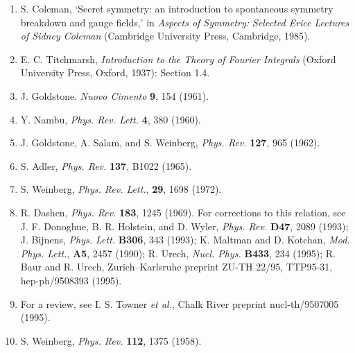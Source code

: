 
\begin{enumerate}
\item {}\label{ch19-ref-1}
S. Coleman, `Secret symmetry: an introduction to spontaneous symmetry breakdown and gauge fields,' in \emph{Aspects of Symmetry: Selected Erice Lectures of Sidney Coleman} (Cambridge University Press, Cambridge, 1985).

\item {}\label{ch19-ref-2}
E. C. Titchmarsh, \emph{Introduction to the Theory of Fourier Integrals} (Oxford University Press, Oxford, 1937): Section 1.4.

\item {}\label{ch19-ref-3}
J. Goldstone. \emph{Nuovo Cimento} \textbf{9}, 154 (1961).

\item {}\label{ch19-ref-4}
Y. Nambu, \emph{Phys. Rev. Lett.} \textbf{4}, 380 (1960).

\item {}\label{ch19-ref-5}
J. Goldstone, A. Salam, and S. Weinberg, \emph{Phys. Rev.} \textbf{127}, 965 (1962).

\item {}\label{ch19-ref-6}
S. Adler, \emph{Phys. Rev.} \textbf{137}, B1022 (1965).

\item {}\label{ch19-ref-7}
S. Weinberg, \emph{Phys. Rev. Lett.}, \textbf{29}, 1698 (1972).

\item {}\label{ch19-ref-8}
R. Dashen, \emph{Phys. Rev.} \textbf{183}, 1245 (1969). For corrections to this relation, see J. F. Donoghue, B. R. Holstein, and D. Wyler, \emph{Phys. Rev.} \textbf{D47}, 2089 (1993); J. Bijnens, \emph{Phys. Lett.} \textbf{B306}, 343 (1993); K. Maltman and D. Kotchan, \emph{Mod. Phys. Lett.}, \textbf{A5}, 2457 (1990); R. Urech, \emph{Nucl. Phys.} \textbf{B433}, 234 (1995); R. Baur and R. Urech, Zurich--Karlsruhe preprint ZU-TH 22/95, TTP95-31, hep-ph/9508393 (1995).

\item {}\label{ch19-ref-9}
For a review, see I. S. Towner \emph{et al.}, Chalk River preprint nucl-th/9507005 (1995).

\item {}\label{ch19-ref-10}
S. Weinberg, \emph{Phys. Rev.} \textbf{112}, 1375 (1958).


\end{enumerate}
